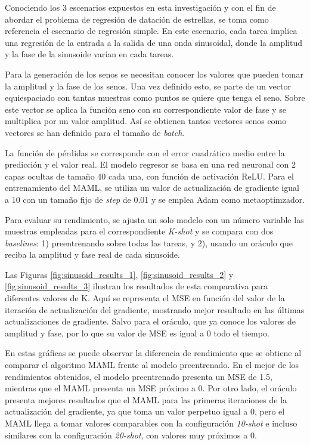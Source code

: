 Conociendo los 3 escenarios expuestos en esta investigación y con el fin de abordar el problema de regresión de datación de estrellas, se toma como referencia el escenario de regresión simple. En este escenario, cada tarea implica una regresión de la entrada a la salida de una onda sinusoidal, donde la amplitud y la fase de la sinusoide varían en cada tareas.

Para la generación de los senos se necesitan conocer los valores que pueden tomar la amplitud y la fase de los senos. Una vez definido esto, se parte de un vector equiespaciado con tantas muestras como puntos se quiere que tenga el seno. Sobre este vector se aplica la función seno con su correspondiente valor de fase y se multiplica por un valor amplitud. Así se obtienen tantos vectores senos como vectores se han definido para el tamaño de \emph{batch}.%

La función de pérdidas se corresponde con el error cuadrático medio entre la predicción y el valor real. El modelo regresor se basa en una red neuronal con 2 capas ocultas de tamaño 40 cada una, con función de activación ReLU. Para el entrenamiento del MAML, se utiliza un valor de actualización de gradiente igual a 10 con un tamaño fijo de \emph{step} de 0.01 y se emplea Adam como metaoptimzador.


Para evaluar su rendimiento, se ajusta un solo modelo con un número variable las muestras empleadas para el correspondiente \emph{K-shot} y se compara con dos \emph{baselines}: 1) preentrenando sobre todas las tareas, y 2), usando un oráculo que reciba la amplitud y fase real de cada sinusoide.

Las Figuras \ref{fig:sinusoid_results_1}, \ref{fig:sinusoid_results_2} y \ref{fig:sinusoid_results_3} ilustran los resultados de esta comparativa para diferentes valores de K. Aquí se representa el MSE en función del valor de la iteración de actualización del gradiente, mostrando mejor resultado en las últimas actualizaciones de gradiente. Salvo para el oráculo, que ya conoce los valores de amplitud y fase, por lo que su valor de MSE es igual a 0 todo el tiempo.

En estas gráficas se puede observar la diferencia de rendimiento que se obtiene al comparar el algoritmo MAML frente al modelo preentrenado. En el mejor de los rendimientos obtenidos, el modelo preentrenado presenta un MSE de 1.5, mientras que el MAML presenta un MSE próximo a 0. Por otro lado, el oráculo presenta mejores resultados que el MAML para las primeras iteraciones de la actualización del gradiente, ya que toma un valor perpetuo igual a 0, pero el MAML llega a tomar valores comparables con la configuración \emph{10-shot} e incluso similares con la configuración \emph{20-shot}, con valores muy próximos a 0.

